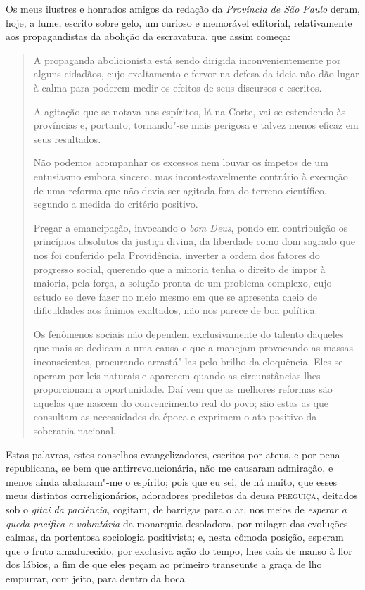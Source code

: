 Os meus ilustres e honrados amigos da redação da \emph{Província de São
Paulo} deram, hoje, a lume, escrito sobre gelo, um curioso e memorável
editorial, relativamente aos propagandistas da abolição da escravatura,
que assim começa:

\begin{quote}
A propaganda abolicionista está sendo dirigida inconvenientemente por
alguns cidadãos, cujo exaltamento e fervor na defesa da ideia não dão
lugar à calma para poderem medir os efeitos de seus discursos e
escritos.

A agitação que se notava nos espíritos, lá na Corte, vai se estendendo
às províncias e, portanto, tornando"-se mais perigosa e talvez menos
eficaz em seus resultados.

Não podemos acompanhar os excessos nem louvar os ímpetos de um
entusiasmo embora sincero, mas incontestavelmente contrário à execução
de uma reforma que não devia ser agitada fora do terreno científico,
segundo a medida do critério positivo.

Pregar a emancipação, invocando o \emph{bom Deus}, pondo em contribuição
os princípios absolutos da justiça divina, da liberdade como dom sagrado
que nos foi conferido pela Providência, inverter a ordem dos fatores do
progresso social, querendo que a minoria tenha o direito de impor à
maioria, pela força, a solução pronta de um problema complexo, cujo
estudo se deve fazer no meio mesmo em que se apresenta cheio de
dificuldades aos ânimos exaltados, não nos parece de boa política.

Os fenômenos sociais não dependem exclusivamente do talento daqueles que
mais se dedicam a uma causa e que a manejam provocando as massas
inconscientes, procurando arrastá"-las pelo brilho da eloquência. Eles se
operam por leis naturais e aparecem quando as circunstâncias lhes
proporcionam a oportunidade. Daí vem que as melhores reformas são
aquelas que nascem do convencimento real do povo; são estas as que
consultam as necessidades da época e exprimem o ato positivo da
soberania nacional.
\end{quote}

\noindent\dotfill{}

Estas palavras, estes conselhos evangelizadores, escritos por ateus, e
por pena republicana, se bem que antirrevolucionária, não me causaram
admiração, e menos ainda abalaram"-me o espírito; pois que eu sei, de há
muito, que esses meus distintos correligionários, adoradores prediletos
da deusa \textsc{preguiça}, deitados sob o \emph{gitai da paciência}, cogitam, de
barrigas para o ar, nos meios de \emph{esperar a queda pacífica e
voluntária} da monarquia desoladora, por milagre das evoluções calmas,
da portentosa sociologia positivista; e, nesta cômoda posição, esperam
que o fruto amadurecido, por exclusiva ação do tempo, lhes caía de manso
à flor dos lábios, a fim de que eles peçam ao primeiro transeunte a
graça de lho empurrar, com jeito, para dentro da boca.

